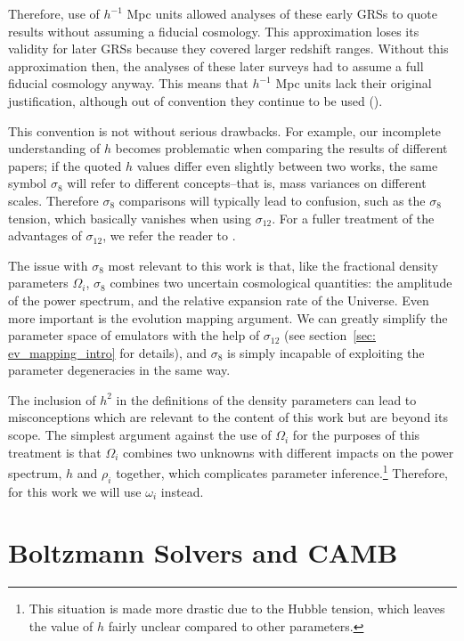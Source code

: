 Therefore, use of $h^{-1}$ Mpc units allowed analyses of these early GRSs
to quote results without assuming a fiducial cosmology. This
approximation loses its validity for later GRSs because they covered larger
redshift ranges. Without this approximation then, the analyses of these later
surveys had to assume a full fiducial cosmology anyway. This means that
$h^{-1}$ Mpc units lack their original justification, although out of
convention they continue to be used ().

This convention is not without serious drawbacks.
For example, our incomplete understanding of $h$
becomes problematic when comparing the results of different papers;
if the quoted $h$ values differ even slightly between two works, the same
symbol $\sigma_8$ will refer to different concepts--that is, mass variances on
different scales. Therefore $\sigma_8$ comparisons will typically lead to
confusion, such as the $\sigma_8$ tension, which basically vanishes when using
$\sigma_{12}$. For a fuller treatment of the advantages of $\sigma_{12}$, we
refer the reader to .

The issue with $\sigma_8$ most relevant to this work is that, like the
fractional density parameters $\Omega_i$, $\sigma_8$ combines two uncertain
cosmological quantities: the amplitude of the power spectrum, and the
relative expansion rate of the Universe. Even more important is the evolution 
mapping argument. We can greatly simplify the
parameter space of emulators with the help of $\sigma_{12}$
(see section~\ref{sec: ev_mapping_intro} for details), and $\sigma_8$
is simply incapable of exploiting the parameter degeneracies in the same way.


The inclusion of $h^2$ in the definitions of the density
parameters can lead to misconceptions which are relevant to the content of
this work but are beyond its scope. The simplest argument against the use of 
$\Omega_i$ for the purposes of
this treatment is that $\Omega_i$ combines two unknowns
with different impacts on the power spectrum, $h$ and $\rho_i$
together, which complicates parameter inference.\footnote{This situation is 
made more drastic due to the Hubble tension, which leaves the value of $h$ 
fairly unclear compared to other parameters.} Therefore, for this work we
will use $\omega_i$ instead.

\section{Boltzmann Solvers and CAMB}
\label{sec: boltzmann_intro}

